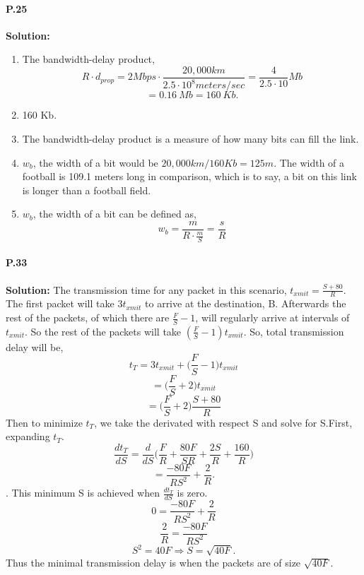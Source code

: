 \documentclass[12pt]{article}
\begin{document}
                                                                                                                                             
\paragraph{P.25\\}                                                                                                                                                     
\textbf{Solution:}
\begin{enumerate}[label = \alph*)]
\item The bandwidth-delay product,\\
$$R\cdot d_{prop} = 2Mbps \cdot \frac{ 20,000 km }{ 2.5\cdot 10^8 meters/sec } = \frac{4}{2.5\cdot 10 } Mb$$
$$= 0.16\ Mb = 160\ Kb.$$
\item 160 Kb.
\item The bandwidth-delay product is a measure of how many bits can fill the link.
\item $w_b$, the width of a bit would be $20,000km/160Kb = 125 m$. The width of a football is 109.1 meters long in comparison, which is to say, a bit on this link is longer than a football field.
\item $w_b$, the width of a bit can be defined as,\\
$$w_b = \frac{m}{R\cdot \frac{m}{S} } = \frac{s}{R}$$
\end{enumerate}

                                                                                                                                            
\paragraph{P.33\\}                                                                                                                                                     
\textbf{Solution:}
The transmission time for any packet in this scenario, $t_{xmit} = \frac{S + 80}{R}$. The first packet will take $3t_{xmit}$ to arrive at the destination, B. Afterwards the rest of the packets, of which there are $\frac{F}{S}-1$, will regularly arrive at intervals of $t_{xmit}$. So the rest of the packets will take $(\frac{F}{S} - 1 )t_{xmit}$. So, total transmission delay will be,\\
$$t_T = 3t_{xmit} + \Bigg(\frac{F}{S} - 1\Bigg )t_{xmit}$$
$$=\Bigg(\frac{F}{S} + 2\Bigg)t_{xmit}$$
$$=\Bigg(\frac{F}{S} + 2\Bigg)\frac{S + 80}{R}$$
Then to minimize $t_T$, we take the derivated with respect S and solve for S.First, expanding $t_T$.\\
$$\frac{dt_T}{dS} = \frac{d}{dS}\Bigg( \frac{F}{R} + \frac{80F}{SR} + \frac{2S}{R} + \frac{160}{R}\Bigg )$$
$$ = \frac{-80F}{RS^2} + \frac{2}{R}.$$.
This minimum S is achieved when $\frac{dt_T}{dS}$ is zero. \\
$$ 0 = \frac{-80F}{RS^2} + \frac{2}{R}$$
$$\frac{2}{R} = \frac{-80F}{RS^2}$$
$$S^2 =40F \Rightarrow S = \sqrt{40F}.$$
Thus the minimal transmission delay is when the packets are of size $\sqrt{40F}$.
\end{document}

